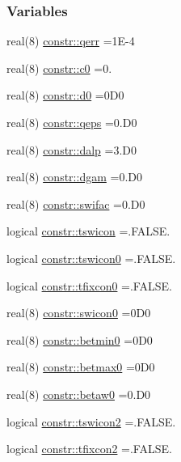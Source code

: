 \subsubsection*{Variables}
\begin{DoxyCompactItemize}
\item 
real(8) \hyperlink{namespaceconstr_a4e28cb213fb0c9679bdcca7dd4c64542}{constr\+::qerr} =1\+E-\/4
\item 
real(8) \hyperlink{namespaceconstr_acae195768a31542ac96a58b68d894253}{constr\+::c0} =0.
\item 
real(8) \hyperlink{namespaceconstr_a604072f42d782b0664f52b3c06da75f3}{constr\+::d0} =0\+D0
\item 
real(8) \hyperlink{namespaceconstr_a16ee5bae6ffa0fec223e35ca042499a8}{constr\+::qeps} =0.\+D0
\item 
real(8) \hyperlink{namespaceconstr_a059179482b95154c05c0476d1fd80dda}{constr\+::dalp} =3.\+D0
\item 
real(8) \hyperlink{namespaceconstr_a2ba7200830052d0e14c259604eb096be}{constr\+::dgam} =0.\+D0
\item 
real(8) \hyperlink{namespaceconstr_a3fd79277600455ba53c2bba7052f8d14}{constr\+::swifac} =0.\+D0
\item 
logical \hyperlink{namespaceconstr_adc54cf7417be68f0c9e76ac4aa3a2785}{constr\+::tswicon} =.F\+A\+L\+S\+E.
\item 
logical \hyperlink{namespaceconstr_ab201eb89c495c33e406fb3e01120314e}{constr\+::tswicon0} =.F\+A\+L\+S\+E.
\item 
logical \hyperlink{namespaceconstr_a76159265fc288587aafd56361bfe9706}{constr\+::tfixcon0} =.F\+A\+L\+S\+E.
\item 
real(8) \hyperlink{namespaceconstr_ad537476e003e8f1e0d92299966b5fe70}{constr\+::swicon0} =0\+D0
\item 
real(8) \hyperlink{namespaceconstr_abe35529a6c8456a7cf906998a2aaedfb}{constr\+::betmin0} =0\+D0
\item 
real(8) \hyperlink{namespaceconstr_a7fbe5760b32df936a8089956632bff62}{constr\+::betmax0} =0\+D0
\item 
real(8) \hyperlink{namespaceconstr_af683ee0f56a77110349e1fcde0234c2d}{constr\+::betaw0} =0.\+D0
\item 
logical \hyperlink{namespaceconstr_ad4c9b2c5bda593b7630642866cd93358}{constr\+::tswicon2} =.F\+A\+L\+S\+E.
\item 
logical \hyperlink{namespaceconstr_a66742ff27c6afbcbc425dfb72bca40dd}{constr\+::tfixcon2} =.F\+A\+L\+S\+E.
\item 

\end{DoxyCompactItemize}

